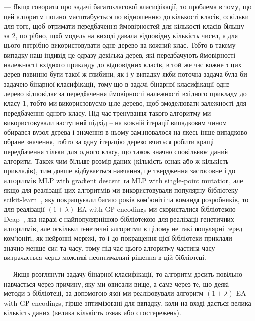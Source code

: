 --- Якщо говорити про задачі багатокласової класифікації, то проблема в тому, що цей алгоритм погано масштабується по відношенню до кількості класів, оскільки для того, щоб отримати передбачення ймовірностей для кількості класів більшу за 2, потрібно, щоб модель на виході давала відповідну кількість чисел, а для цього потрібно використовувати одне дерево на кожний клас. Тобто в такому випадку наш індивід це одразу декілька дерев, які передбачують ймовірності належності вхідного прикладу до відповідних класів, в той же час кожне з цих дерев повинно бути такої ж глибини, як і у випадку якби поточна задача була би задачею бінарної класифікації, тому що в задачі бінарної класифікації одне дерево відповідає за передбачення ймовірності належності вхідного прикладу до класу 1, тобто ми використовуємо ціле дерево, щоб змоделювати залежності для передбачення одного класу. Під час тренування такого алгоритму ми використовували наступний підхід -- на кожній ітерації випадковим чином обирався вузол дерева і значення в ньому замінювалося на якесь інше випадково обране значення, тобто за одну ітерацію дерево вчиться робити кращі передбачення тільки для одного класу, що також значно сповільнює даний алгоритм. Також чим більше розмір даних (кількість ознак або ж кількість прикладів), тим довше відбувається навчання, це твердження застосовне і до алгоритмів MLP with gradient descent та MLP with single-point mutation, але якщо для реалізації цих алгоритмів ми використовували популярну бібліотеку -- scikit-learn~\cite{ct20}, яку покращували багато років ком'юніті та команда розробників, то для реалізації $(1+\lambda)$-EA with GP encodings ми скористалися бібліотекою Deap~\cite{ct19}, яка наразі є найпопулярнішою бібліотекою для реалізації генетичних алгоритмів, але оскільки генетичні алгоритми в цілому не такі популярні серед ком'юніті, як нейронні мережі, то і до покращення цієї бібліотеки приклали значно менше сил та часу, тому під час цього алгоритму частина часу витрачається через можливі неоптимальні рішення в цій бібліотеці.

--- Якщо розглянути задачу бінарної класифікації, то алгоритм досить повільно навчається через причину, яку ми описали вище, а саме через те, що деякі методи в бібліотеці, за допомогою якої ми реалізовували алгоритм $(1+\lambda)$-EA with GP encodings, гірше оптимізовані для випадку, коли на вході дається велика кількість даних (велика кількість ознак або спостережень).

